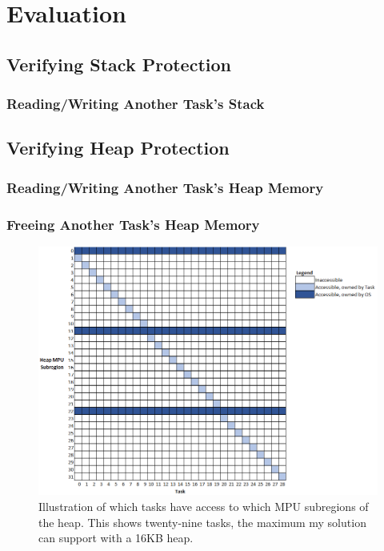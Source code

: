 
\chapter{Evaluation}

\section{Verifying Stack Protection}

\subsection{Reading/Writing Another Task's Stack}

\section{Verifying Heap Protection}

\subsection{Reading/Writing Another Task's Heap Memory}

\subsection{Freeing Another Task's Heap Memory}

\begin{figure}[h]
	\centering
	\includegraphics[width=\linewidth]{figs/task_access.png}
	\caption{Illustration of which tasks have access to which MPU subregions of the heap. This shows twenty-nine tasks, the maximum my solution can support with a 16KB heap.}
	\label{fig:task_access}
\end{figure}


